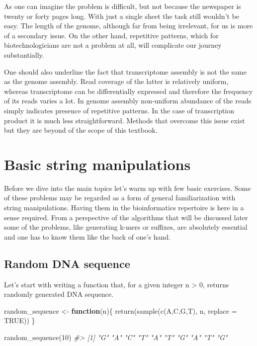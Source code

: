 \documentclass[
]{book}
\newenvironment{Shaded}{\begin{snugshade}}{\end{snugshade}}
\newcommand{\AttributeTok}[1]{\textcolor[rgb]{0.77,0.63,0.00}{#1}}
\newcommand{\CommentTok}[1]{\textcolor[rgb]{0.56,0.35,0.01}{\textit{#1}}}
\newcommand{\ConstantTok}[1]{\textcolor[rgb]{0.00,0.00,0.00}{#1}}
\newcommand{\ControlFlowTok}[1]{\textcolor[rgb]{0.13,0.29,0.53}{\textbf{#1}}}
\newcommand{\DecValTok}[1]{\textcolor[rgb]{0.00,0.00,0.81}{#1}}
\newcommand{\FunctionTok}[1]{\textcolor[rgb]{0.00,0.00,0.00}{#1}}
\newcommand{\NormalTok}[1]{#1}
\newcommand{\OtherTok}[1]{\textcolor[rgb]{0.56,0.35,0.01}{#1}}
\newcommand{\StringTok}[1]{\textcolor[rgb]{0.31,0.60,0.02}{#1}}
\begin{document}
As one can imagine the problem is difficult, but not because the newspaper is twenty or forty pages long. With just a single sheet the task still wouldn't be easy. The length of the genome, although far from being irrelevant, for us is more of a secondary issue. On the other hand, repetitive patterns, which for biotechnologicians are not a problem at all, will complicate our journey substantially.

One should also underline the fact that transcriptome assembly is not the same as the genome assembly. Read coverage of the latter is relatively uniform, whereas transcriptome can be differentially expressed and therefore the frequency of its reads varies a lot. In genome assembly non-uniform abundance of the reads simply indicates presence of repetitive patterns. In the case of transcription product it is much less straightforward. Methods that overcome this issue exist but they are beyond of the scope of this textbook.

\hypertarget{basic}{%
\chapter{Basic string manipulations}\label{basic}}

Before we dive into the main topics let's warm up with few basic exercises. Some of these problems may be regarded as a form of general familiarization with string manipulations. Having them in the bioinformatics repertoire is here in a sense required. From a perspective of the algorithms that will be discussed later some of the problems, like generating k-mers or suffixes, are absolutely essential and one has to know them like the back of one's hand.

\hypertarget{random-dna-sequence}{%
\section{Random DNA sequence}\label{random-dna-sequence}}

Let's start with writing a function that, for a given integer n \textgreater{} 0, returns randomly generated DNA sequence.

\begin{Shaded}
\begin{Highlighting}[]
\NormalTok{random\_sequence }\OtherTok{\textless{}{-}} \ControlFlowTok{function}\NormalTok{(n)\{}
  \FunctionTok{return}\NormalTok{(}\FunctionTok{sample}\NormalTok{(}\FunctionTok{c}\NormalTok{(}\StringTok{\textquotesingle{}A\textquotesingle{}}\NormalTok{,}\StringTok{\textquotesingle{}C\textquotesingle{}}\NormalTok{,}\StringTok{\textquotesingle{}G\textquotesingle{}}\NormalTok{,}\StringTok{\textquotesingle{}T\textquotesingle{}}\NormalTok{), n, }\AttributeTok{replace =} \ConstantTok{TRUE}\NormalTok{))}
\NormalTok{\}}

\FunctionTok{random\_sequence}\NormalTok{(}\DecValTok{10}\NormalTok{)}
\CommentTok{\#\textgreater{}  [1] "G" "A" "C" "T" "A" "T" "G" "A" "T" "G"}
\end{Highlighting}
\end{Shaded}
\end{document}
